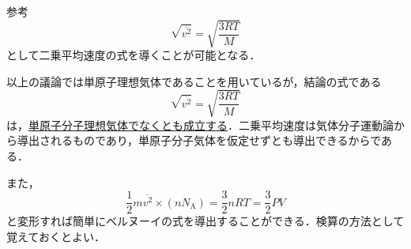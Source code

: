 \begin{multicols}{2}
\begin{bsHosoku}{参考}
\[\sqrt{\overline{v^2}}=\sqrt{\frac{3RT}{M}}\]
として二乗平均速度の式を導くことが可能となる．\par
\hspace*{1zw}以上の議論では単原子理想気体であることを用いているが，結論の式である
\[\sqrt{\overline{v^2}}=\sqrt{\frac{3RT}{M}}\]
は，\underline{単原子}\hskip0pt\underline{分子理}\hskip0pt\underline{想気体}\hskip0pt\underline{でなく}\hskip0pt\underline{とも成}\hskip0pt\underline{立する}．二乗平均速度は気体分子運動論から導出されるものであり，単原子分子気体を仮定せずとも導出できるからである．\par
\hspace*{1zw}また，
\[\frac{1}{2}m\overline{v^2}\times(nN_{\mathrm{A}})=\frac{3}{2}nRT=\frac{3}{2}PV\]
と変形すれば簡単にベルヌーイの式を導出することができる．検算の方法として覚えておくとよい．
\end{bsHosoku}


\end{multicols}
